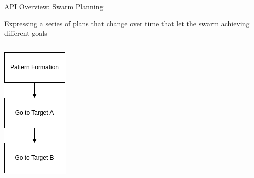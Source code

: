 \documentclass[presentation, 9pt]{beamer}\mode<presentation>{\usetheme{AMSBolognaFC}}
\begin{document}
\begin{frame}[fragile]{API Overview: Swarm Planning}

	Expressing a series of plans that change over time that let the swarm achieving different goals
\vspace{0.4cm}
\begin{columns}
\begin{column}{0.2\textwidth}
\centering
\includegraphics[width=\textwidth]{img/swarm-planner.drawio.png}

\end{column}
\end{columns}
\end{frame}
\end{document}
